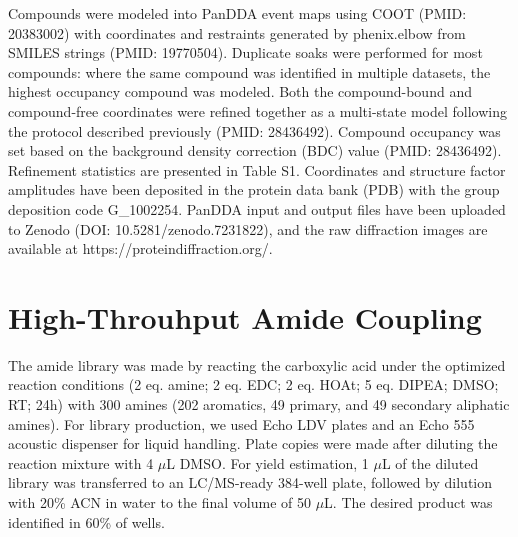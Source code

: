 Compounds were modeled into PanDDA event maps using COOT (PMID: 20383002) with coordinates and restraints generated by phenix.elbow from SMILES strings (PMID: 19770504). Duplicate soaks were performed for most compounds: where the same compound was identified in multiple datasets, the highest occupancy compound was modeled. Both the compound-bound and compound-free coordinates were refined together as a multi-state model following the protocol described previously (PMID: 28436492). Compound occupancy was set based on the background density correction (BDC) value (PMID: 28436492). Refinement statistics are presented in Table S1. Coordinates and structure factor amplitudes have been deposited in the protein data bank (PDB) with the group deposition code G\_1002254. PanDDA input and output files have been uploaded to Zenodo (DOI: 10.5281/zenodo.7231822), and the raw diffraction images are available at https://proteindiffraction.org/.

\section{High-Throuhput Amide Coupling} \label{appendix:amide_coupling}
The amide library was made by reacting the carboxylic acid under the optimized reaction conditions (2 eq. amine; 2 eq. EDC; 2 eq. HOAt; 5 eq. DIPEA; DMSO; RT; 24h) with 300 amines (202 aromatics, 49 primary, and 49 secondary aliphatic amines). For library production, we used Echo LDV plates and an Echo 555 acoustic dispenser for liquid handling. Plate copies were made after diluting the reaction mixture with 4 $\mu$L DMSO. For yield estimation, 1 $\mu$L of the diluted library was transferred to an LC/MS-ready 384-well plate, followed by dilution with 20\% ACN in water to the final volume of 50 $\mu$L. The desired product was identified in 60\% of wells.